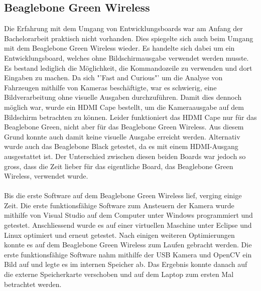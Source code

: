 \subsection{Beaglebone Green Wireless}
Die Erfahrung mit dem Umgang von Entwicklungsboards war am Anfang der Bachelorarbeit praktisch nicht vorhanden. Dies spiegelte sich auch beim Umgang mit dem Beaglebone Green Wireless wieder. Es handelte sich dabei um ein Entwicklungsboard, welches ohne Bildschirmausgabe verwendet werden musste. Es bestand lediglich die Möglichkeit, die Kommandozeile zu verwenden und dort Eingaben zu machen. Da sich "'Fast and Curious"' um die Analyse von Fahrzeugen mithilfe von Kameras beschäftigte, war es schwierig, eine Bildverarbeitung ohne visuelle Ausgaben durchzuführen. Damit dies dennoch möglich war, wurde ein HDMI Cape bestellt, um die Kameraausgabe auf dem Bildschirm betrachten zu können. Leider funktioniert das HDMI Cape nur für das Beaglebone Green, nicht aber für das Beaglebone Green Wireless. Aus diesem Grund konnte auch damit keine visuelle Ausgabe erreicht werden. 
Alternativ wurde auch das Beaglebone Black getestet, da es mit einem HDMI-Ausgang ausgestattet ist. Der Unterschied zwischen diesen beiden Boards war jedoch so gross, dass die Zeit lieber für das eigentliche Board, das Beaglebone Green Wireless, verwendet wurde.\\\\ 
Bis die erste Software auf dem Beaglebone Green Wireless lief, verging einige Zeit. Die erste funktionsfähige Software zum Ansteuern der Kamera wurde mithilfe von Visual Studio auf dem Computer unter Windows programmiert und getestet. Anschliessend wurde es auf einer virtuellen Maschine unter Eclipse und Linux optimiert und erneut getestet. Nach einigen weiteren Optimierungen konnte es auf dem Beaglebone Green Wireless zum Laufen gebracht werden. Die erste funktionsfähige Software nahm mithilfe der USB Kamera und OpenCV ein Bild auf und legte es im internen Speicher ab. Das Ergebnis konnte danach auf die externe Speicherkarte verschoben und auf dem Laptop zum ersten Mal betrachtet werden.